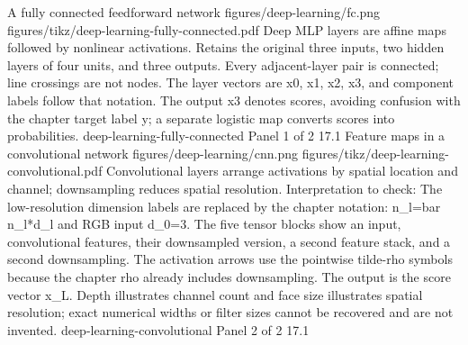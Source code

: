 {A fully connected feedforward network}
{figures/deep-learning/fc.png}
{figures/tikz/deep-learning-fully-connected.pdf}
{Deep MLP layers are affine maps followed by nonlinear activations.}
{Retains the original three inputs, two hidden layers of four units, and three outputs. Every adjacent-layer pair is connected; line crossings are not nodes. The layer vectors are x0, x1, x2, x3, and component labels follow that notation. The output x3 denotes scores, avoiding confusion with the chapter target label y; a separate logistic map converts scores into probabilities.}
{deep-learning-fully-connected}
{Panel 1 of 2}
{17.1}
{Feature maps in a convolutional network}
{figures/deep-learning/cnn.png}
{figures/tikz/deep-learning-convolutional.pdf}
{Convolutional layers arrange activations by spatial location and channel; downsampling reduces spatial resolution.}
{Interpretation to check: The low-resolution dimension labels are replaced by the chapter notation: n\_l=bar n\_l*d\_l and RGB input d\_0=3. The five tensor blocks show an input, convolutional features, their downsampled version, a second feature stack, and a second downsampling. The activation arrows use the pointwise tilde-rho symbols because the chapter rho already includes downsampling. The output is the score vector x\_L. Depth illustrates channel count and face size illustrates spatial resolution; exact numerical widths or filter sizes cannot be recovered and are not invented.}
{deep-learning-convolutional}
{Panel 2 of 2}
{17.1}
